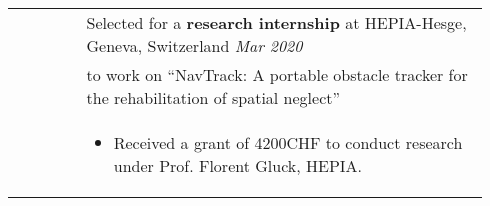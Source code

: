 \documentclass[letterpaper, 10pt, oneside]{article}
\begin{document}
\begin{longtable}{@{} p{0.14\linewidth} p{0.8\linewidth}}
    & Selected for a \textbf{research internship} at HEPIA-Hesge, Geneva, Switzerland \hfill \textit{Mar 2020} \\
    & to work on ``NavTrack: A portable obstacle tracker for the rehabilitation of spatial neglect''\\
    & \parbox{0.8\textwidth}{%
      \begin{itemize}[leftmargin=6ex, itemsep=-0.88ex, topsep=-0.88ex]
          \item Received a grant of 4200CHF to conduct research under Prof. Florent Gluck, HEPIA.
      \end{itemize}
    }  
\\

\end{longtable}
\end{document}
